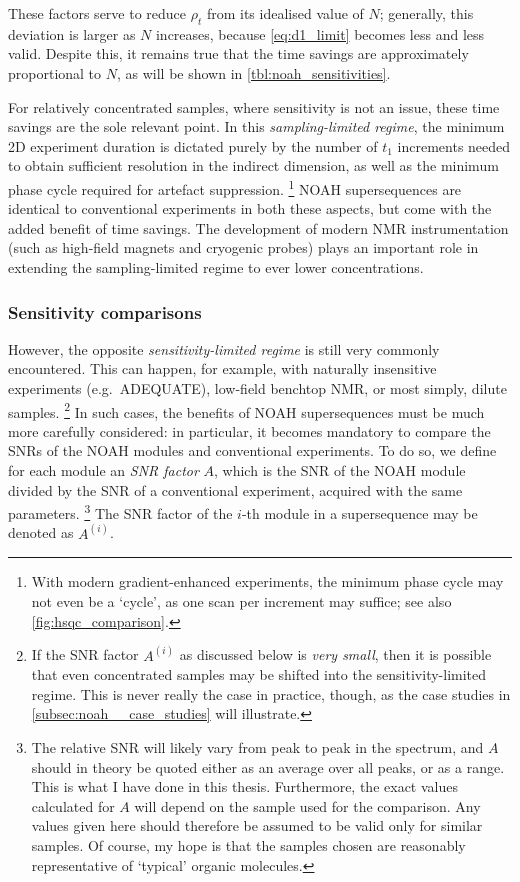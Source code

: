 These factors serve to reduce $\rho_t$ from its idealised value of $N$; generally, this deviation is larger as $N$ increases, because \cref{eq:d1_limit} becomes less and less valid.
Despite this, it remains true that the time savings are approximately proportional to $N$, as will be shown in \cref{tbl:noah_sensitivities}.

For relatively concentrated samples, where sensitivity is not an issue, these time savings are the sole relevant point.
In this \textit{sampling-limited regime}, the minimum 2D experiment duration is dictated purely by the number of $t_1$ increments needed to obtain sufficient resolution in the indirect dimension, as well as the minimum phase cycle required for artefact suppression.%
\footnote{With modern gradient-enhanced experiments, the minimum phase cycle may not even be a `cycle', as one scan per increment may suffice; see also \cref{fig:hsqc_comparison}.}
NOAH supersequences are identical to conventional experiments in both these aspects, but come with the added benefit of time savings.
The development of modern NMR instrumentation (such as high-field magnets and cryogenic probes) plays an important role in extending the sampling-limited regime to ever lower concentrations.


\subsubsection{Sensitivity comparisons}

However, the opposite \textit{sensitivity-limited regime} is still very commonly encountered.
This can happen, for example, with naturally insensitive experiments (e.g.\ ADEQUATE), low-field benchtop NMR, or most simply, dilute samples.%
\footnote{If the SNR factor $A^{(i)}$ as discussed below is \textit{very small}, then it is possible that even concentrated samples may be shifted into the sensitivity-limited regime. This is never really the case in practice, though, as the case studies in \cref{subsec:noah__case_studies} will illustrate.}
In such cases, the benefits of NOAH supersequences must be much more carefully considered: in particular, it becomes mandatory to compare the SNRs of the NOAH modules and conventional experiments.
To do so, we define for each module an \textit{SNR factor} $A$, which is the SNR of the NOAH module divided by the SNR of a conventional experiment, acquired with the same parameters.%
\footnote{The relative SNR will likely vary from peak to peak in the spectrum, and $A$ should in theory be quoted either as an average over all peaks, or as a range.
This is what I have done in this thesis.
Furthermore, the exact values calculated for $A$ will depend on the sample used for the comparison.
Any values given here should therefore be assumed to be valid only for similar samples.
Of course, my hope is that the samples chosen are reasonably representative of `typical' organic molecules.}
The SNR factor of the $i$-th module in a supersequence may be denoted as $A^{(i)}$.


